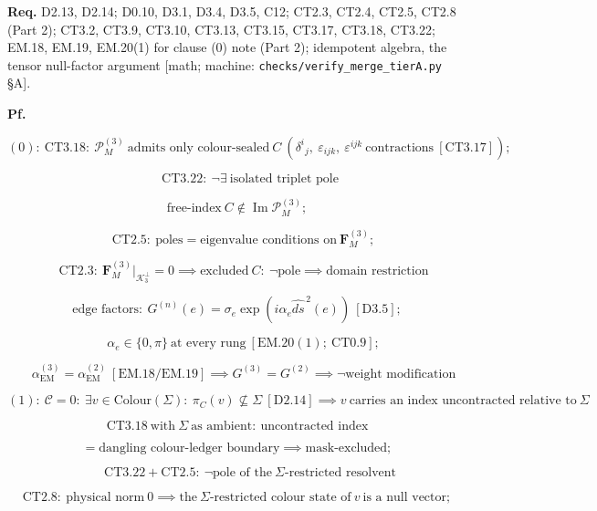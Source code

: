 \begin{theorem}
\textbf{Req.} D2.13, D2.14; D0.10, D3.1, D3.4, D3.5, C12; CT2.3, CT2.4, CT2.5, CT2.8 (Part 2); CT3.2, CT3.9, CT3.10, CT3.13, CT3.15, CT3.17, CT3.18, CT3.22; EM.18, EM.19, EM.20(1) for clause (0) note (Part 2); idempotent algebra, the tensor null-factor argument [math; machine: \texttt{checks/\allowbreak{}verify\_\allowbreak{}merge\_\allowbreak{}tierA.py} §A].

\textbf{Pf.}

\[
(0):\ \mathrm{CT3.18}:\ \mathcal P_M^{(3)}\ \text{admits only colour-sealed}\ C\ (\delta^i{}_j,\ \varepsilon_{ijk},\ \varepsilon^{ijk}\ \text{contractions}\ [\mathrm{CT3.17}]);
\]

\[
\qquad \mathrm{CT3.22}:\ \neg\exists\ \text{isolated triplet pole}
\]

\[
\text{free-index}\ C\notin\operatorname{Im}\mathcal P_M^{(3)};
\]

\[
\quad \mathrm{CT2.5}:\ \text{poles}=\text{eigenvalue conditions on}\ \mathbf F_M^{(3)};
\]

\[
\quad \mathrm{CT2.3}:\ \mathbf F_M^{(3)}\big|_{\mathcal K_3^\perp}=0\implies\text{excluded}\ C:\ \neg\text{pole}\implies\text{domain restriction}
\]

\[
\text{edge factors}:\ G^{(n)}(e)=\sigma_e\exp(i\alpha_e\widehat{ds}^{\,2}(e))\ [\mathrm{D3.5}];
\]

\[
\quad \alpha_e\in\{0,\pi\}\ \text{at every rung}\ [\mathrm{EM.20}(1);\ \mathrm{CT0.9}];
\]

\[
\quad \alpha_{\mathrm{EM}}^{(3)}=\alpha_{\mathrm{EM}}^{(2)}\ [\mathrm{EM.18}/\mathrm{EM.19}]\implies G^{(3)}=G^{(2)}\implies\neg\text{weight modification}
\]

\[
(1):\ \mathcal C=0:\ \exists v\in\mathrm{Colour}(\Sigma):\ \pi_C(v)\not\subseteq\Sigma\ [\mathrm{D2.14}]\implies v\ \text{carries an index uncontracted relative to}\ \Sigma
\]

\[
\mathrm{CT3.18}\ \text{with}\ \Sigma\ \text{as ambient}:\ \text{uncontracted index}
\]

\[
= \text{dangling colour-ledger boundary}\implies\text{mask-excluded};
\]

\[
\qquad \mathrm{CT3.22}+\mathrm{CT2.5}:\ \neg\text{pole of the}\ \Sigma\text{-restricted resolvent}
\]

\[
\mathrm{CT2.8}:\ \text{physical norm}\ 0\implies\text{the}\ \Sigma\text{-restricted colour state of}\ v\ \text{is a null vector};
\]


\end{theorem}
